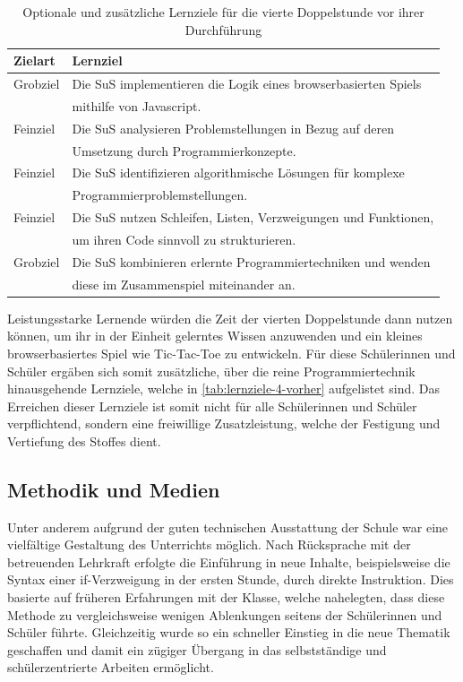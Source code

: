 \begin{table}[h!]
	\begin{tabular*}{\linewidth}{l|l}
		\hline
		\textbf{Zielart} & \textbf{Lernziel}\\
		\hline \hline
		Grobziel & Die SuS implementieren die Logik eines browserbasierten Spiels\\
		& mithilfe von Javascript.\\
		Feinziel & Die SuS analysieren Problemstellungen in Bezug auf deren\\
		& Umsetzung durch Programmierkonzepte.\\
		Feinziel & Die SuS identifizieren algorithmische Lösungen für komplexe\\
		& Programmierproblemstellungen.\\
		Feinziel & Die SuS nutzen Schleifen, Listen, Verzweigungen und Funktionen,\\
		& um ihren Code sinnvoll zu strukturieren.\\
		\hline
		Grobziel & Die SuS kombinieren erlernte Programmiertechniken und wenden\\
		& diese im Zusammenspiel miteinander an.\\
		\hline
	\end{tabular*}
	\caption{Optionale und zusätzliche Lernziele für die vierte Doppelstunde vor ihrer Durchführung}
	\label{tab:lernziele-4-vorher}
\end{table}

Leistungsstarke Lernende würden die Zeit der vierten Doppelstunde dann nutzen können, um ihr in der Einheit gelerntes Wissen anzuwenden und ein kleines browserbasiertes Spiel wie Tic-Tac-Toe zu entwickeln.
Für diese Schülerinnen und Schüler ergäben sich somit zusätzliche, über die reine Programmiertechnik hinausgehende Lernziele, welche in \autoref{tab:lernziele-4-vorher} aufgelistet sind.
Das Erreichen dieser Lernziele ist somit nicht für alle Schülerinnen und Schüler verpflichtend, sondern eine freiwillige Zusatzleistung, welche der Festigung und Vertiefung des Stoffes dient.


\subsection{Methodik und Medien}
\label{subsec:methodik-medien}

Unter anderem aufgrund der guten technischen Ausstattung der Schule war eine vielfältige Gestaltung des Unterrichts möglich.
Nach Rücksprache mit der betreuenden Lehrkraft erfolgte die Einführung in neue Inhalte, beispielsweise die Syntax einer if-Verzweigung in der ersten Stunde, durch direkte Instruktion.
Dies basierte auf früheren Erfahrungen mit der Klasse, welche nahelegten, dass diese Methode zu vergleichsweise wenigen Ablenkungen seitens der Schülerinnen und Schüler führte.
Gleichzeitig wurde so ein schneller Einstieg in die neue Thematik geschaffen und damit ein zügiger Übergang in das selbstständige und schülerzentrierte Arbeiten ermöglicht.


